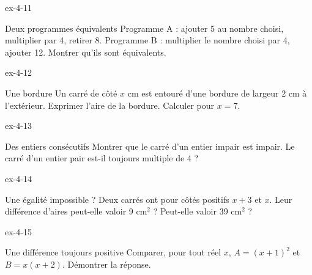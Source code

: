 \clearpage{}
\begin{blocLivre}{ex-4-11}\begin{exercice}[3]{Deux programmes équivalents}
Programme A : ajouter 5 au nombre choisi, multiplier par 4, retirer 8. Programme B : multiplier le nombre choisi par 4, ajouter 12. Montrer qu’ils sont équivalents.
\end{exercice}\end{blocLivre}
\begin{blocLivre}{ex-4-12}\begin{exercice}[3]{Une bordure}
Un carré de côté $x$ cm est entouré d’une bordure de largeur 2 cm à l’extérieur. Exprimer l’aire de la bordure. Calculer pour $x=7$.
\label{fig-ex-4-12}
\end{exercice}\end{blocLivre}
\begin{blocLivre}{ex-4-13}\begin{exercice}[3]{Des entiers consécutifs}
Montrer que le carré d’un entier impair est impair. Le carré d’un entier pair est-il toujours multiple de 4 ?
\end{exercice}\end{blocLivre}
\begin{blocLivre}{ex-4-14}\begin{exercice}[3]{Une égalité impossible ?}
Deux carrés ont pour côtés positifs $x+3$ et $x$. Leur différence d’aires peut-elle valoir 9 cm$^2$ ? Peut-elle valoir 39 cm$^2$ ?
\end{exercice}\end{blocLivre}
\begin{blocLivre}{ex-4-15}\begin{exercice}[3]{Une différence toujours positive}
Comparer, pour tout réel $x$, $A=(x+1)^2$ et $B=x(x+2)$. Démontrer la réponse.
\end{exercice}\end{blocLivre}

\clearpage
